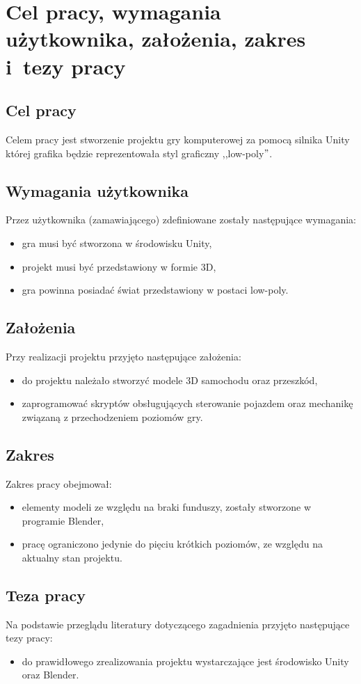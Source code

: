 \chapter{Cel pracy, wymagania użytkownika, założenia, zakres i~tezy pracy}
\section{Cel pracy}\label{cel}
Celem pracy jest stworzenie projektu gry komputerowej za pomocą silnika Unity której grafika będzie reprezentowała styl graficzny ,,low-poly$"$.

\section{Wymagania użytkownika}
Przez użytkownika (zamawiającego) zdefiniowane zostały następujące wymagania:
\begin{itemize}
\item gra musi być stworzona w środowisku Unity,
\item projekt musi być przedstawiony w formie 3D,
\item gra powinna posiadać świat przedstawiony w postaci low-poly.
\end{itemize}
\section{Założenia}
Przy realizacji projektu przyjęto następujące założenia:
\begin{itemize}
\item do projektu należało stworzyć modele 3D samochodu oraz przeszkód,
\item zaprogramować skryptów obsługujących sterowanie pojazdem oraz mechanikę związaną z przechodzeniem poziomów gry.
\end{itemize}
\section{Zakres}
Zakres pracy obejmował:
\begin{itemize}
\item elementy modeli ze względu na braki funduszy, zostały stworzone w programie Blender,
\item pracę ograniczono jedynie do pięciu krótkich poziomów, ze względu na aktualny stan projektu.
\end{itemize}
\section{Teza pracy}
Na podstawie przeglądu literatury dotyczącego zagadnienia przyjęto następujące tezy pracy:
\begin{itemize}
  \item do prawidłowego zrealizowania projektu wystarczające jest środowisko Unity oraz Blender.
\end{itemize}

